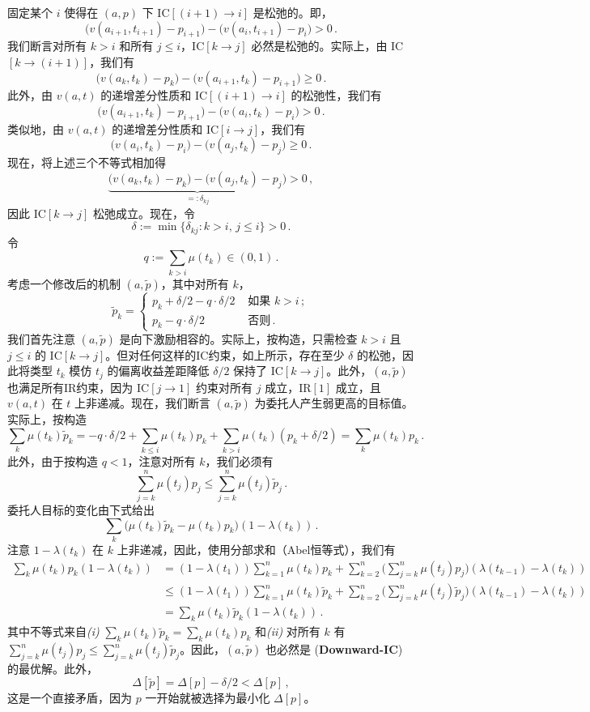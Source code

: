 \documentclass[12pt,letterpaper]{article}
\newenvironment{translation}{\color{blue}\noindent}{}
\theoremstyle{plain}
\theoremstyle{definition}
\theoremstyle{remark}
\renewcommand{\1}{\mathds{1}}
\theoremstyle{definition}
\begin{document}
\begin{translation}
固定某个 $i$ 使得在 $(a, p)$ 下 IC$[(i+1) \rightarrow i]$ 是松弛的。即，
\[\big(v(a_{i+1}, t_{i+1}) - p_{i+1}\big) - \big(v(a_{i}, t_{i+1}) - p_{i}\big) > 0\,.\]
我们断言对所有 $k > i$ 和所有 $j \leq i$，IC$[k \rightarrow j]$ 必然是松弛的。实际上，由 IC$[k \rightarrow (i+1)]$，我们有
\[\big(v(a_{k}, t_{k}) - p_{k}\big) - \big(v(a_{i+1}, t_{k}) - p_{i+1}\big) \geq 0\,.\]
此外，由 $v(a, t)$ 的递增差分性质和 IC$[(i+1) \rightarrow i]$ 的松弛性，我们有
\[\big(v(a_{i+1}, t_{k}) - p_{i+1}\big) - \big(v(a_{i}, t_{k}) - p_{i}\big) > 0\,.\]
类似地，由 $v(a, t)$ 的递增差分性质和 IC$[i \rightarrow j]$，我们有
\[\big(v(a_{i}, t_{k}) - p_{i}\big) - \big(v(a_{j}, t_{k}) - p_{j}\big) \geq 0\,.\]
现在，将上述三个不等式相加得
\[\underbrace{\big(v(a_{k}, t_{k}) - p_{k}\big) - \big(v(a_{j}, t_{k}) - p_{j}\big)}_{=: \delta_{kj}} > 0\,, \]
因此 IC$[k \rightarrow j]$ 松弛成立。现在，令
\[\delta := \min\big\{\delta_{kj}: k > i,\, j \leq i\big\} > 0\,.\]
令
\[q := \sum_{k > i} \mu(t_k) \in (0, 1)\,. \]
考虑一个修改后的机制 $(a, \tilde{p})$，其中对所有 $k$，
\[
    \tilde{p}_k =
\begin{cases}
 p_k + \delta/2 - q \cdot \delta/2 & \text{ 如果 $k > i$}\,;\\
 p_k - q \cdot \delta/2 & \text{ 否则}\,.
\end{cases}
\]
我们首先注意 $(a, \tilde{p})$ 是向下激励相容的。实际上，按构造，只需检查 $k > i$ 且 $j \leq i$ 的 IC$[k \rightarrow j]$。但对任何这样的IC约束，如上所示，存在至少 $\delta$ 的松弛，因此将类型 $t_k$ 模仿 $t_{j}$ 的偏离收益差距降低 $\delta/2$ 保持了 IC$[k \rightarrow j]$。此外，$(a, \tilde{p})$ 也满足所有IR约束，因为 IC$[j \rightarrow 1]$ 约束对所有 $j$ 成立，IR$[1]$ 成立，且 $v(a, t)$ 在 $t$ 上非递减。现在，我们断言 $(a, \tilde{p})$ 为委托人产生弱更高的目标值。实际上，按构造
\[\sum_k \mu(t_k) \tilde{p}_k  =  - q \cdot \delta/2 + \sum_{k \leq i} \mu(t_k) p_k + \sum_{k > i}\mu(t_k) (p_k + \delta/2) = \sum_k \mu(t_k) p_k\,. \]
此外，由于按构造 $q < 1$，注意对所有 $k$，我们必须有
\[\sum_{j=k}^n \mu(t_j) p_j \leq \sum_{j=k}^n \mu(t_j) \tilde{p}_j \,.\]
委托人目标的变化由下式给出
\[\sum_k \Big(\mu(t_k)\tilde{p}_k  - \mu(t_k)p_k\Big) (1 - \lambda(t_k))\,.\]
注意 $1 - \lambda(t_k)$ 在 $k$ 上非递减，因此，使用分部求和（Abel恒等式），我们有
\begin{align*}
 \sum_k \mu(t_k) p_k (1 - \lambda(t_k)) &=   (1 - \lambda(t_1)) \sum_{k=1}^n \mu(t_k)p_k + \sum_{k=2}^n \Big(\sum_{j=k}^n  \mu(t_j) p_j\Big) ( \lambda(t_{k-1}) - \lambda(t_k)) \\
 &\leq (1 - \lambda(t_1)) \sum_{k=1}^n \mu(t_k) \tilde{p}_k + \sum_{k=2}^n \Big(\sum_{j=k}^n \mu(t_j) \tilde{p}_j  \Big) ( \lambda(t_{k-1}) - \lambda(t_k))\,
 \\
 &=  \sum_k \mu(t_k) \tilde{p}_k (1 - \lambda(t_k))\,.
\end{align*}
其中不等式来自\textit{(i)} $\sum_k \mu(t_k) \tilde{p}_k = \sum_k \mu(t_k) p_k$ 和\textit{(ii)} 对所有 $k$ 有 $\sum_{j=k}^n \mu(t_j) p_j \leq \sum_{j=k}^n \mu(t_j) \tilde{p}_j$。因此，$(a, \tilde{p})$ 也必然是 (\textbf{Downward-IC}) 的最优解。此外，
\[\Delta[\tilde{p}] = \Delta[p] - \delta/2 < \Delta[p]\,,\]
这是一个直接矛盾，因为 $p$ 一开始就被选择为最小化 $\Delta[p]$。
\end{translation}
\end{document}
